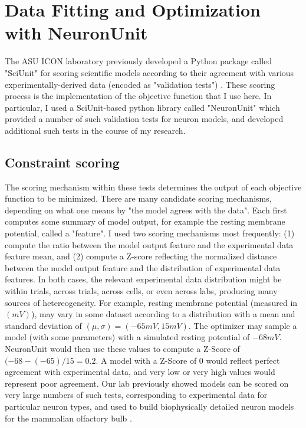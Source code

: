 \section{Data Fitting and Optimization with NeuronUnit}
The ASU ICON laboratory previously developed a Python package called "SciUnit" for scoring scientific models according to their agreement with various experimentally-derived data (encoded as "validation tests") \cite{omar2014collaborative}.  These scoring process is the implementation of the objective function that I use here.
In particular, I used a SciUnit-based python library called "NeuronUnit" which provided a number of such validation tests for neuron models, and developed additional such tests in the course of my research.

\subsection{Constraint scoring}
The scoring mechanism within these tests determines the output of each objective function to be minimized.  There are many candidate scoring mechanisms, depending on what one means by "the model agrees with the data".  Each first computes some summary of model output, for example the resting membrane potential, called a "feature".
I used two scoring mechanisms most frequently: (1) compute the ratio between the model output feature and the experimental data feature mean, and (2) compute a Z-score reflecting the normalized distance between the model output feature and the distribution of experimental data features.
In both cases, the relevant experimental data distribution might be within trials, across trials, across cells, or even across labs, producing many sources of hetereogeneity.
For example, resting membrane potential (measured in $(mV)$), may vary in some dataset according to a distribution with a mean and standard deviation of $(\mu,\sigma)=(-65mV,15mV)$.
The optimizer may sample a model (with some parameters) with a simulated resting potential of $-68mV$.  
NeuronUnit would then use these values to compute a Z-Score of $(-68 - (-65)/15 = 0.2$.
A model with a Z-Score of 0 would reflect perfect agreement with experimental data, and very low or very high values would represent poor agreement.
Our lab previously showed models can be scored on very large numbers of such tests, corresponding to experimental data for particular neuron types, and used to build biophysically detailed neuron models for the mammalian olfactory bulb \cite{birgiolas2019towards}.

